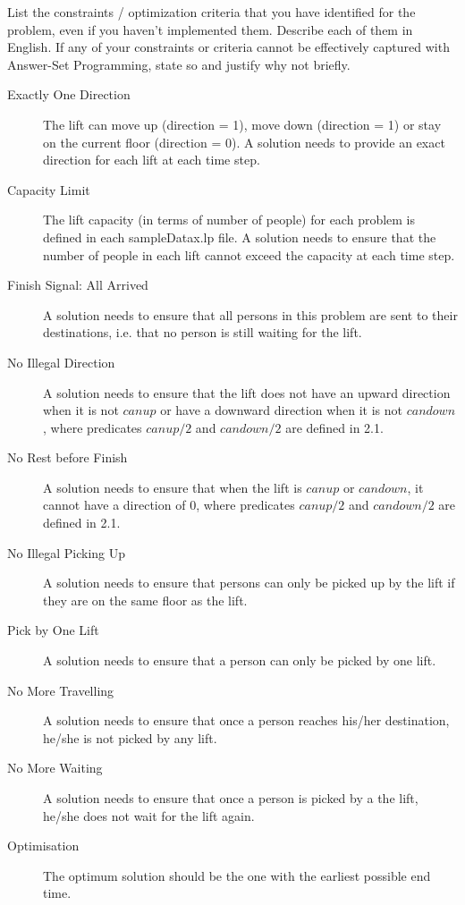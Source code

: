 \documentclass{article}
\begin{document}
\begin{Question}
\begin{Subquestion}
\label{q:list-constraints}
List the constraints / optimization criteria that you have identified for the problem, even if you haven't implemented them.
Describe each of them in English.
If any of your constraints or criteria cannot be effectively captured with Answer-Set Programming, state so and justify why not briefly.
\begin{answer}
\begin{description}
\item[Exactly One Direction] The lift can move up (direction = 1), move down (direction = 1) or stay on the current floor (direction = 0). A solution needs to provide an exact direction for each lift at each time step.
\item[Capacity Limit] The lift capacity (in terms of number of people) for each problem is defined in each sampleDatax.lp file. A solution needs to ensure that the number of people in each lift cannot exceed the capacity at each time step. 
\item[Finish Signal: All Arrived] A solution needs to ensure that all persons in this problem are sent to their destinations, i.e. that no person is still waiting for the lift.
\item[No Illegal Direction] A solution needs to ensure that the lift does not have an upward direction when it is not $canup$ or have a downward direction when it is not $candown$, where predicates $canup/2$ and $candown/2$ are defined in 2.1.
\item[No Rest before Finish] A solution needs to ensure that when the lift is $canup$ or $candown$, it cannot have a direction of 0, where predicates $canup/2$ and $candown/2$ are defined in 2.1.
\item[No Illegal Picking Up] A solution needs to ensure that persons can only be picked up by the lift if they are on the same floor as the lift. 
\item[Pick by One Lift] A solution needs to ensure that a person can only be picked by one lift.
\item[No More Travelling] A solution needs to ensure that once a person reaches his/her destination, he/she is not picked by any lift. 
\item[No More Waiting] A solution needs to ensure that once a person is picked by a the lift, he/she does not wait for the lift again. 
\item[Optimisation] The optimum solution should be the one with the earliest possible end time.  

\end{description}
\end{answer}
\end{Subquestion}
\end{Question}
\end{document}
